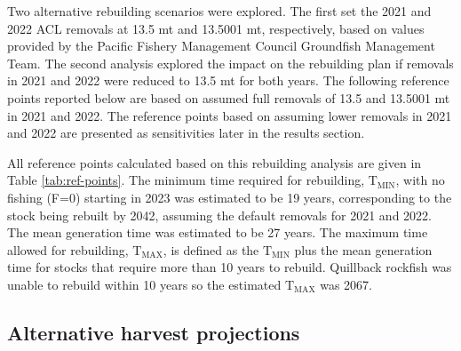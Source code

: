 \documentclass[11pt,
  english,
  a4paper,
]{article}
\begin{document}
Two alternative rebuilding scenarios were explored. The first set the 2021 and 2022 ACL removals at 13.5 mt and 13.5001 mt, respectively, based on values provided by the Pacific Fishery Management Council Groundfish Management Team. The second analysis explored the impact on the rebuilding plan if removals in 2021 and 2022 were reduced to 13.5 mt for both years. The following reference points reported below are based on assumed full removals of 13.5 and 13.5001 mt in 2021 and 2022. The reference points based on assuming lower removals in 2021 and 2022 are presented as sensitivities later in the results section.

\leavevmode\tagmcend\tagstructend\par


All reference points calculated based on this rebuilding analysis are given in Table \ref{tab:ref-points}. The minimum time required for rebuilding, {\(\text{T}_\text{MIN}\)\leavevmode\tagmcend\tagstructend}, with no fishing (F=0) starting in 2023 was estimated to be 19 years, corresponding to the stock being rebuilt by 2042, assuming the default removals for 2021 and 2022. The mean generation time was estimated to be 27 years. The maximum time allowed for rebuilding, {\(\text{T}_\text{MAX}\)\leavevmode\tagmcend\tagstructend}, is defined as the {\(\text{T}_\text{MIN}\)\leavevmode\tagmcend\tagstructend} plus the mean generation time for stocks that require more than 10 years to rebuild. Quillback rockfish was unable to rebuild within 10 years so the estimated {\(\text{T}_\text{MAX}\)\leavevmode\tagmcend\tagstructend} was 2067.

\leavevmode\tagmcend\tagstructend\par


\hypertarget{alternative-harvest-projections}{%
\subsection{Alternative harvest projections}\label{alternative-harvest-projections}}

\leavevmode\tagmcend\tagstructend

\end{document}

